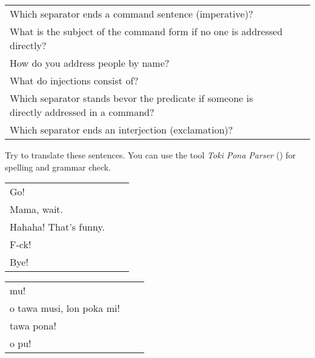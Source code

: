 \begin{supertabular}{p{5,5cm}|ll}
    Which separator ends a command sentence (imperative)?                                      &  & \\
    What is the subject of the command form if no one is addressed directly?                   &  & \\
    How do you address people by name?                                                         &  & \\
    What do injections consist of?                                                             &  & \\
    Which separator stands bevor  the predicate if someone is directly addressed in a command? &  & \\
    Which separator ends an interjection (exclamation)?                                        &  & \\
\end{supertabular}

Try to translate these sentences.
You can use the tool \textit{Toki Pona Parser} (\cite{www:rowa:02}) for spelling and grammar check.

\begin{supertabular}{p{5,5cm}|ll}
    Go!                   &  & \\
    Mama, wait.           &  & \\
    Hahaha! That's funny. &  & \\
    F-ck!                 &  & \\
    Bye!                  &  & \\
\end{supertabular}

\begin{supertabular}{p{5,5cm}|ll}
    mu!                       &  & \\
    o tawa musi, lon poka mi! &  & \\
    tawa pona!                &  & \\
    o pu!                     &  & \\
\end{supertabular}

